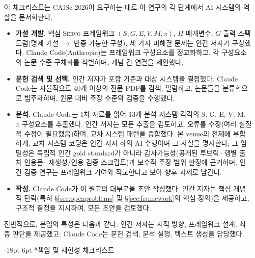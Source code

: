 \documentclass[11pt]{article}
\makeatletter
\renewcommand\section{\@startsection{section}{1}{\z@}%
  {-18pt \@plus -4pt \@minus -2pt}%
  {6pt \@plus 2pt}%
  {\normalfont\large\bfseries}}
\newcommand{\sgmvpi}{$(S, G, E, V, M, \pi)$}
\newcommand{\framework}{\textsc{Servo}}
\makeatother
\begin{document}
이 체크리스트는 CAISc 2026이 요구하는 대로 이 연구의 각 단계에서 AI 시스템의 역할을 문서화한다.

\begin{itemize}
  \item \textbf{가설 개발.} 핵심 \framework{} 프레임워크 \sgmvpi{}, $H$ 매개변수, $G$ 출력 스펙트럼(명제 가설 $\to$ 반증 가능한 구성), 세 가지 미해결 문제는 인간 저자가 구상했다. Claude Code(Anthropic)는 프레임워크 구성요소를 정교화하고, 각 구성요소의 논문 수준 구체화를 식별하며, 개념 간 연결을 제안했다.

  \item \textbf{문헌 검색 및 선택.} 인간 저자가 포함 기준과 대상 시스템을 결정했다. Claude Code는 자율적으로 40개 이상의 전문 PDF를 검색, 열람하고, 논문들을 분류학으로 범주화하며, 원문 대비 주장 수준의 검증을 수행했다.

  \item \textbf{분석.} Claude Code는 1차 자료를 읽어 13개 분석 시스템 각각의 S, G, E, V, M, $\pi$ 구성요소를 추출했다. 인간 저자는 모든 추출을 검토하고, 오류를 수정(여러 실질적 수정이 필요했음)하며, 교차 시스템 패턴을 종합했다. 본 venue의 전제에 부합하게, 교차 시스템 코딩은 인간 지시 하의 AI 수행이며 그 사실을 명시한다; 그 엄밀성은 독립적 인간 gold standard가 아니라 감사가능성(공개된 루브릭·행별 출처 인용문·재생성/인용 검증 스크립트)과 보수적 주장 범위 한정에 근거하며, 인간 검증 연구는 프레임워크 기여와 직교한다고 보아 향후 과제로 남긴다.

  \item \textbf{작성.} Claude Code가 이 원고의 대부분을 초안 작성했다. 인간 저자는 핵심 개념적 단락(특히 §\ref{sec:openproblems} 및 §\ref{sec:framework}의 핵심 정의)을 제공하고, 구조적 결정을 지시하며, 모든 초안을 검토했다.
\end{itemize}

\noindent 전반적으로, 분업의 특성은 다음과 같다: 인간 저자는 지적 방향, 프레임워크 설계, 최종 판단을 제공했고; Claude Code는 문헌 검색, 분석 실행, 텍스트 생성을 담당했다.

\newpage
\section*{책임 및 재현성 체크리스트}
\label{sec:repro-checklist}
\end{document}
